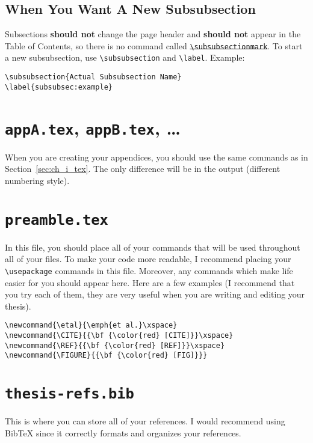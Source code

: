 \subsection{When You Want A New Subsubsection}

Subsections {\bf should not} change the page header and {\bf should not} appear in the Table of Contents, so there is no command called \st{\texttt{\textbackslash subsubsectionmark}}. To start a new subsubsection, use \texttt{\textbackslash subsubsection} and \texttt{\textbackslash label}. Example:
\small\vskip-25pt
\begin{singlespace}
\begin{verbatim}
\subsubsection{Actual Subsubsection Name}
\label{subsubsec:example}
\end{verbatim}
\end{singlespace}
\normalsize

\section[\texttt{appA.tex}, \texttt{appB.tex}, \dots]{\texttt{appA.tex}, \texttt{appB.tex}, \dots}
\label{sec:app_i_tex}

When you are creating your appendices, you should use the same commands as in Section~\ref{sec:ch_i_tex}. The only difference will be in the output (different numbering style).

\section[\texttt{preamble.tex}]{\texttt{preamble.tex}}
\label{sec:preamble_tex}

In this file, you should place all of your commands that will be used throughout all of your files. To make your code more readable, I recommend placing your \texttt{\textbackslash usepackage} commands in this file. Moreover, any commands which make life easier for you should appear here. Here are a few examples (I recommend that you try each of them, they are very useful when you are writing and editing your thesis).

\begin{lstlisting}
\newcommand{\etal}{\emph{et al.}\xspace}
\newcommand{\CITE}{{\bf {\color{red} [CITE]}}\xspace}
\newcommand{\REF}{{\bf {\color{red} [REF]}}\xspace}
\newcommand{\FIGURE}{{\bf {\color{red} [FIG]}}}
\end{lstlisting}

\section[\texttt{thesis-refs.bib}]{\texttt{thesis-refs.bib}}
\label{sec:thesis_refs_bib}

This is where you can store all of your references. I would recommend using BibTeX since it correctly formats and organizes your references.
